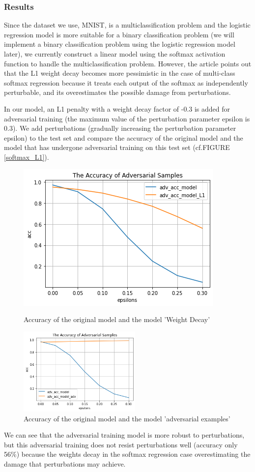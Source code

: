 \subsubsection{Results}
Since the dataset we use, MNIST, is a multiclassification problem and the logistic regression model is more suitable for a binary classification problem (we will implement a binary classification problem using the logistic regression model later), we currently construct a linear model using the softmax activation function to handle the multiclassification problem. However, the article points out that the L1 weight decay becomes more pessimistic in the case of multi-class softmax regression because it treats each output of the softmax as independently perturbable, and its overestimates the possible damage from perturbations. 


In our model, an L1 penalty with a weight decay factor of -0.3 is added for adversarial training (the maximum value of the perturbation parameter epsilon is 0.3). We add perturbations (gradually increasing the perturbation parameter epsilon) to the test set and compare the accuracy of the original model and the model that has undergone adversarial training on this test set (cf.FIGURE \ref{softmax_L1}). 
\begin{figure}[htb]
\centering
\begin{minipage}[t]{0.48\textwidth}
\centering
\includegraphics[width=6 cm]{softmax_modelL1.png}
\caption{Accuracy of the original model and the model 'Weight Decay'}
\label{softmax_L1}
\end{minipage}
\begin{minipage}[t]{0.48\textwidth}
\centering
\includegraphics[width=6cm]{softmax_model_adv_ex.png}
\caption{Accuracy of the original model and the model 'adversarial examples'}
\label{softmax_adv}
\end{minipage}
\end{figure}
We can see that the adversarial training model is more robust to perturbations, but this adversarial training does not resist perturbations well (accuracy only 56\%) because the weights decay in the softmax regression case overestimating the damage that perturbations may achieve.

